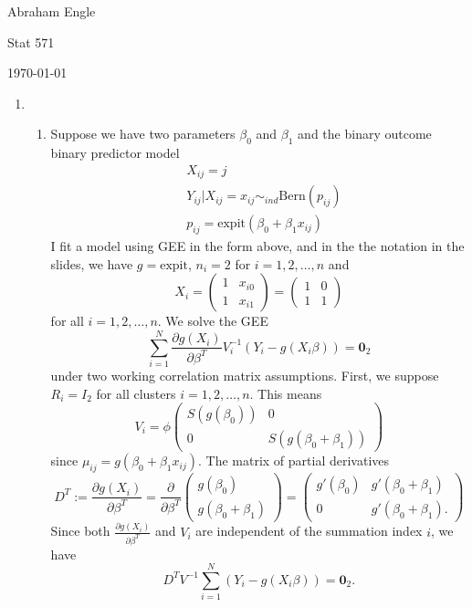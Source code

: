\documentclass[11pt]{article}
\begin{document}
\pagestyle{empty}
\hfill Abraham Engle

\hfill Stat 571

\hfill \today
\begin{enumerate}
	\item 
	\begin{enumerate}
	\item 
			Suppose we have two parameters $\beta_0$ and $\beta_1$ and the binary outcome binary predictor model
			\begin{align*}
				&X_{ij} = j \\
				&Y_{ij} | X_{ij}=x_{ij} \sim_{ind} \mathrm{Bern}(p_{ij}) \\
				&p_{ij} = \mathrm{expit}(\beta_0 + \beta_1x_{ij})
			\end{align*}
			I fit a model using GEE in the form above, and in the the notation in the slides, we have $g = \mathrm{expit}$, $n_i=2$ for $i=1,2,\dotsc,n$ and
			\[
				X_i = \begin{pmatrix}
				1 & x_{i0} \\
				1 & x_{i1}
				\end{pmatrix} = \begin{pmatrix}
				1 & 0 \\
				1 & 1
				\end{pmatrix}
			\]
			for all $i=1,2,\dotsc,n$. We solve the GEE
			\[
				\sum_{i=1}^N \frac{\partial g(X_i)}{\partial \beta^T} V_i^{-1} (Y_i-g(X_i\beta)) = \bm{0}_2
			\]
			under two working correlation matrix assumptions. First, we suppose $R_i = I_2$ for all clusters $i=1,2,\dotsc,n$. This means
			\[
				V_i = \phi \begin{pmatrix}
				S(g(\beta_0)) & 0 \\
				0 & S(g(\beta_0+\beta_1))
				\end{pmatrix}
			\]
			since $\mu_{ij} = g(\beta_0+\beta_1x_{ij})$. The matrix of partial derivatives
			\[
				D^T:=\frac{\partial g(X_i)}{\partial \beta^T} = \frac{\partial}{\partial\beta^T} \begin{pmatrix}
				g(\beta_0) \\
				g(\beta_0+\beta_1)
				\end{pmatrix} = \begin{pmatrix}
				g'(\beta_0) & g'(\beta_0+\beta_1) \\
				0 & g'(\beta_0+\beta_1).
				\end{pmatrix}
			\]
			Since both $\frac{\partial g(X_i)}{\partial \beta^T}$ and $V_i$ are independent of the summation index $i$, we have
			\[
				D^TV^{-1}\sum_{i=1}^N (Y_i-g(X_i\beta)) = \bm{0}_2.
\]
\end{enumerate}
\end{enumerate}
\end{document}
